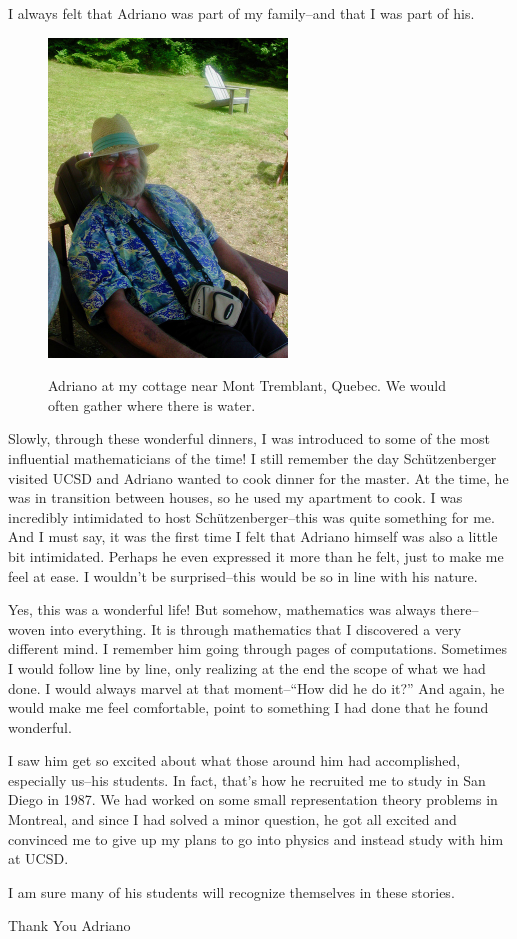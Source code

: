 \documentclass{notices}
\begin{document}
I always felt that Adriano was part of my family--and that I was part of his. 

\begin{figure}[h]
\includegraphics[width=2.5in]{Nantel_Bergeron/DSCN3064.jpeg}

{\footnotesize Adriano at my cottage near Mont Tremblant, Quebec. We would often gather where there is water.}
\end{figure}

Slowly, through these wonderful dinners, I was introduced to some of the most influential mathematicians of the time! I still remember the day Schützenberger visited UCSD and Adriano wanted to cook dinner for the master. At the time, he was in transition between houses, so he used my apartment to cook. I was incredibly intimidated to host Schützenberger--this was quite something for me. And I must say, it was the first time I felt that Adriano himself was also a little bit intimidated. Perhaps he even expressed it more than he felt, just to make me feel at ease. I wouldn’t be surprised--this would be so in line with his nature.

Yes, this was a wonderful life! But somehow, mathematics was always there--woven into everything. It is through mathematics that I discovered a very different mind. I remember him going through pages of computations. Sometimes I would follow line by line, only realizing at the end the scope of what we had done. I would always marvel at that moment--``How did he do it?'' And again, he would make me feel comfortable, point to something I had done that he found wonderful.

I saw him get so excited about what those around him had accomplished, especially us--his students. In fact, that’s how he recruited me to study in San Diego in 1987. We had worked on some small representation theory problems in Montreal, and since I had solved a minor question, he got all excited and convinced me to give up my plans to go into physics and instead study with him at UCSD.

I am sure many of his students will recognize themselves in these stories.

Thank You Adriano
\end{document}
